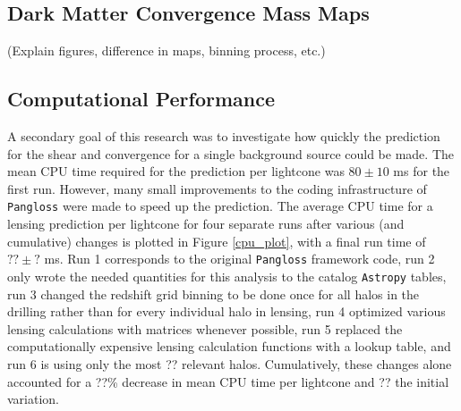 \documentclass[%
 reprint,
 amsmath,amssymb,
 aps,nofootinbib
]{revtex4-1}
\begin{document}
\subsection{Dark Matter Convergence Mass Maps}

%

(Explain figures, difference in maps, binning process, etc.)

\subsection{Computational Performance}

A secondary goal of this research was to investigate how quickly the prediction for the shear and convergence for a single background source could be made. The mean CPU time required for the prediction per lightcone was ${80\pm10}$ ms for the first run. However, many small improvements to the coding infrastructure of \texttt{Pangloss} were made to speed up the prediction. The average CPU time for a lensing prediction per lightcone for four separate runs after various (and cumulative) changes is plotted in Figure \ref{cpu_plot}, with a final run time of $??\pm?$ ms. Run 1 corresponds to the original \texttt{Pangloss} framework code, run 2 only wrote the needed quantities for this analysis to the catalog \texttt{Astropy} tables, run 3 changed the redshift grid binning to be done once for all halos in the drilling rather than for every individual halo in lensing, run 4 optimized various lensing calculations with matrices whenever possible, run 5 replaced the computationally expensive lensing calculation functions with a lookup table, and run 6 is using only the most ?? relevant halos. Cumulatively, these changes alone accounted for a ??\% decrease in mean CPU time per lightcone and ?? the initial variation.
\end{document}
